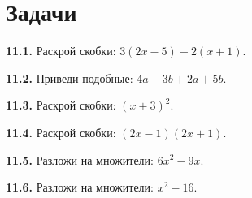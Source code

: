 \section*{Задачи}
\begingroup\setlength{\parskip}{2pt}
\noindent\begin{minipage}[t]{\linewidth}\textbf{11.1.} Раскрой скобки: \(3 (2 x - 5) - 2 (x + 1)\).\par\end{minipage}\par
\noindent\begin{minipage}[t]{\linewidth}\textbf{11.2.} Приведи подобные: \(4 a - 3 b + 2 a + 5 b\).\par\end{minipage}\par
\noindent\begin{minipage}[t]{\linewidth}\textbf{11.3.} Раскрой скобки: \((x + 3)^{2}\).\par\end{minipage}\par
\noindent\begin{minipage}[t]{\linewidth}\textbf{11.4.} Раскрой скобки: \((2 x - 1) (2 x + 1)\).\par\end{minipage}\par
\noindent\begin{minipage}[t]{\linewidth}\textbf{11.5.} Разложи на множители: \(6 x^{2} - 9 x\).\par\end{minipage}\par
\noindent\begin{minipage}[t]{\linewidth}\textbf{11.6.} Разложи на множители: \(x^{2} - 16\).\par\end{minipage}\par
